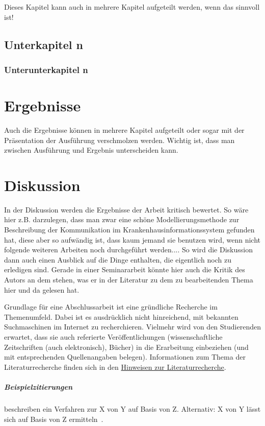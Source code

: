 \documentclass[headsepline,titlepage,twoside,12pt]{report}
\begin{document}
Dieses Kapitel kann auch in mehrere Kapitel aufgeteilt werden, wenn das sinnvoll ist!

\section{Unterkapitel n}

\subsection{Unterunterkapitel n}

\chapter{Ergebnisse}

Auch die Ergebnisse können in mehrere Kapitel aufgeteilt oder sogar mit der Präsentation der Ausführung verschmolzen werden. Wichtig ist, dass man zwischen Ausführung und Ergebnis unterscheiden kann.


\chapter{Diskussion}

In der Diskussion werden die Ergebnisse der Arbeit kritisch bewertet.
So wäre hier z.B. darzulegen, dass man zwar eine schöne Modellierungsmethode zur Beschreibung der Kommunikation im Krankenhausinformationssystem gefunden hat, diese aber so aufwändig ist, dass kaum jemand sie benutzen wird, wenn nicht folgende weiteren Arbeiten noch durchgeführt werden.... So wird die Diskussion dann auch einen Ausblick auf die Dinge enthalten, die eigentlich noch zu erledigen sind.
Gerade in einer Seminararbeit könnte hier auch die Kritik des Autors an dem stehen, was er in der Literatur zu dem zu bearbeitenden Thema hier und da gelesen hat.


\newpage
Grundlage für eine Abschlussarbeit ist eine gründliche Recherche im Themenumfeld. Dabei ist es ausdrücklich nicht hinreichend, mit bekannten Suchmaschinen im Internet zu recherchieren. Vielmehr wird von den Studierenden erwartet, dass sie auch referierte Veröffentlichungen (wissenschaftliche Zeitschriften (auch elektronisch), Bücher) in die Erarbeitung einbeziehen (und mit entsprechenden Quellenangaben belegen). Informationen zum Thema der Literaturrecherche finden sich in den \href{http://www.imise.uni-leipzig.de/Lehre/MedInf/Abschlussarbeiten/Literaturrecherche.jsp}{Hinweisen zur Literaturrecherche}.
\paragraph{Beispielzitierungen}
\citet{his} beschreiben ein Verfahren zur X von Y auf Basis von Z.
Alternativ: X von Y lässt sich auf Basis von Z ermitteln~\citep{his}.
\end{document}
